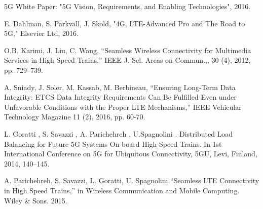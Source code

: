 \documentclass[journal]{IEEEtran}
\begin{document}
{%
\ifCLASSOPTIONcaptionsoff
  \newpage
\fi





%
%
%
\begin{thebibliography}{1}

5G White Paper: "5G Vision, Requirements, and Enabling Technologies", 2016. 

E. Dahlman, S. Parkvall, J. Skold, "4G, LTE-Advanced Pro and The Road to 5G," Elsevier Ltd, 2016.

O.B. Karimi, J. Liu, C. Wang, “Seamless Wireless Connectivity for Multimedia Services in High Speed Trains,” IEEE J. Sel. Areas on Commun.,, 30 (4), 2012, pp. 729–739.

 A. Sniady, J. Soler, M. Kassab, M. Berbineau, “Ensuring Long-Term Data Integrity: ETCS Data Integrity Requirements Can Be Fulfilled Even under Unfavorable Conditions with the Proper LTE Mechanisms,” IEEE Vehicular Technology Magazine 11 (2), 2016, pp. 60-70.

L. Goratti , S. Savazzi , A. Parichehreh , U.Spagnolini . Distributed Load Balancing for Future 5G Systems On-board High-Speed Trains. In 1st International Conference on 5G for Ubiquitous Connectivity, 5GU, Levi, Finland, 2014, 140–145.

A. Parichehreh, S. Savazzi, L. Goratti, U. Spagnolini “Seamless LTE Connectivity in High Speed Trains,” in Wireless Communication and Mobile Computing. Wiley \& Sons. 2015.



\end{thebibliography}}
\end{document}
